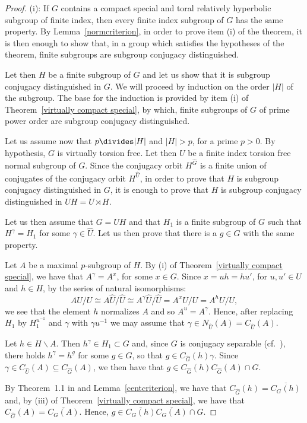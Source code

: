 \documentclass[12pt,twoside]{amsart}
\newcommand\ssm{\smallsetminus}
\newcommand\wh{\widehat}
\theoremstyle{definition}
\begin{document}
\begin{proof}(i): If $G$ contains a compact special and toral relatively hyperbolic subgroup of finite index, then every finite index subgroup of $G$
has the same property. By Lemma~\ref{normcriterion}, in order to prove item (i) of the theorem, it is then enough to show that, in a group which
satisfies the hypotheses of the theorem, finite subgroups are subgroup conjugacy distinguished. 

Let then $H$ be a finite subgroup of $G$ and let us show that it is subgroup conjugacy distinguished in $G$. We will proceed by induction 
on the order $|H|$ of the subgroup. The base for the induction is provided by item (i) of Theorem~\ref{virtually compact special}, 
by which, finite subgroups of $G$ of prime power order are subgroup conjugacy distinguished. 
	
Let us assume now that $p\divides |H|$ and $|H|>p$, for a prime $p>0$. By hypothesis, $G$ is virtually torsion free.  Let then $U$ be a finite index torsion free 
normal subgroup of $G$. Since the conjugacy orbit $H^{\wh{G}}$ is a finite union of conjugates of the conjugacy orbit $H^{\wh{U}}$, in order 
to prove that $H$ is subgroup conjugacy distinguished in $G$, it is enough to prove that $H$ is subgroup conjugacy distinguished in $UH=U\rtimes H$. 

Let us then assume that $G=UH$ and that $H_1$ is a finite subgroup of $G$ such that $H^{\gamma}=H_1$ for some 
$\gamma\in \widehat U$. Let us then prove that there is a $g\in G$ with the same property. 

Let $A$ be a maximal $p$-subgroup of $H$.
By (i) of Theorem~\ref{virtually compact special}, we have that $A^{\gamma }=A^x$, for some $x\in G$. 
Since $x=uh=hu'$, for $u,u'\in U$ and $h\in H$, by the series of natural isomorphisms:
\[AU/U\cong A\widehat U/\widehat U \cong A^{\gamma} \widehat U/\widehat U= A^xU/U=A^{h}U/U,\] 
we see that the element $h$ normalizes $A$ and so $A^u=A^\gamma$. 
Hence, after replacing $H_1$ by $H_1^{u^{-1}}$ and $\gamma$ with $\gamma u^{-1}$  we may assume that 
$\gamma\in N_{\widehat U}(A)=C_{\widehat U}(A)$. 
	
Let $h\in H\ssm A$. Then $h^\gamma\in H_1\subset G$ and, since $G$ is conjugacy separable (cf.\ \cite[Theorem~1.1]{MZ}), there holds
$h^\gamma=h^g$ for some $g\in G$, so that $g\in C_{\widehat G}(h)\gamma$. 
Since $\gamma\in C_{\widehat U}(A)\subseteq C_{\widehat G}(A)$, we then have that $g\in C_{\widehat G}(h) C_{\widehat G}(A)\cap G$.

By Theorem~1.1 in \cite{MZ} and Lemma~\ref{centcriterion}, we have that $C_{\widehat G}(h)=\overline{C_G(h)}$ and, by (iii) of 
Theorem~\ref{virtually compact special}, we have that $C_{\widehat G}(A)=\overline{C_G(A)}$. Hence,
$g\in \overline{C_G(h)}\overline{C_G(A)}\cap G$. 
     	

\end{proof}
\end{document}
